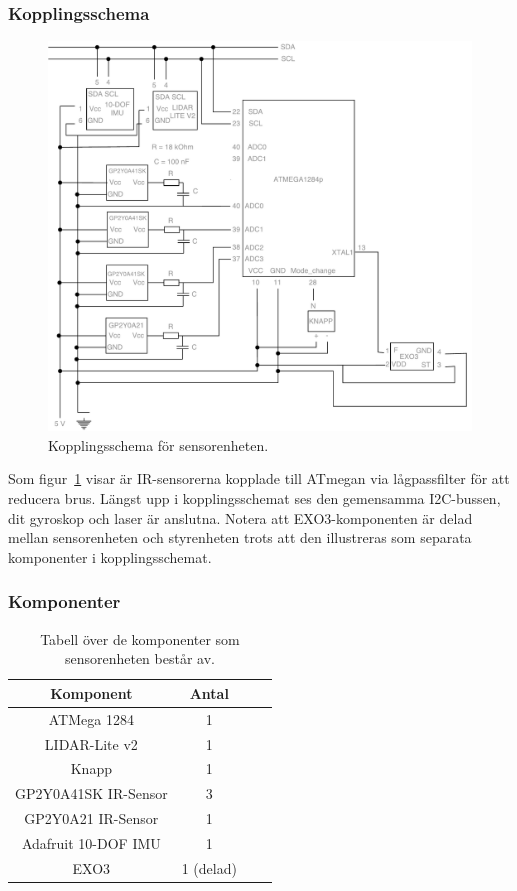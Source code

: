 \documentclass{article}
\begin{document}
\subsubsection{Kopplingsschema}
\begin{figure}[H]
\centering
\includegraphics[scale=0.45]{Sensorenhet_kopplingsschema}
\caption{Kopplingsschema för sensorenheten.}
\label{fig:sensorenhet_kopplingsschema}
\end{figure}

Som figur~\ref{fig:sensorenhet_kopplingsschema} visar är IR-sensorerna kopplade till ATmegan via lågpassfilter för att reducera brus. Längst upp i kopplingsschemat ses den gemensamma I2C-bussen, dit gyroskop och laser är anslutna. Notera att EXO3-komponenten är delad mellan sensorenheten och styrenheten trots att den illustreras som separata komponenter i kopplingsschemat.

\subsubsection{Komponenter}

\begin{table}[H]
  \centering
  \begin{tabular}{ | c | c | c | c |}
    \hline
    \textbf{Komponent} & \textbf{Antal} \\
    \hline
    ATMega 1284 & 1 \\
    \hline
    LIDAR-Lite v2 & 1 \\
    \hline
    Knapp & 1 \\
    \hline
    GP2Y0A41SK IR-Sensor & 3 \\
    \hline
    GP2Y0A21 IR-Sensor & 1 \\
    \hline
    Adafruit 10-DOF IMU & 1 \\
    \hline
    EXO3 & 1 (delad) \\
    \hline
  \end{tabular}
  \caption{ Tabell över de komponenter som sensorenheten består av. }
\end{table}
\end{document}
